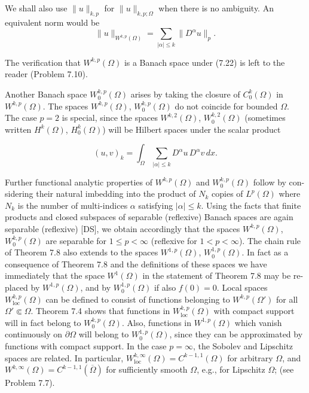 We shall also use $\|u\|_{k,p}$ for $\|u\|_{k,p;\Omega}$ when there is no ambiguity. An equivalent norm would be
\begin{equation}
\tag{7.23}
\|u\|_{W^{k,p}(\Omega)}=\sum_{|\alpha|\leq k} \|D^\alpha u\|_p.
\end{equation}

The verification that $W^{k,p}(\Omega)$ is a Banach space under (7.22) is left to the reader (Problem 7.10).


Another Banach space $W_{0}^{k,p}(\Omega)$ arises by taking the closure of $C_{0}^{k}(\Omega)$ in
$W^{k,p}(\Omega)$. The spaces $W^{k,p}(\Omega)$, $W_{0}^{k,p}(\Omega)$ do not coincide for bounded $\Omega$. The case
$p=2$ is special, since the spaces $W^{k,2}(\Omega)$, $W_{0}^{k,2}(\Omega)$ (sometimes written $H^{k}(\Omega)$,
$H_{0}^{k}(\Omega)$) will be Hilbert spaces under the scalar product

\begin{equation}
\tag{7.24}
(u,v)_{k}=\int_{\Omega}\sum_{|\alpha|\le k} D^{\alpha}u\,D^{\alpha}v\,dx.
\end{equation}

Further functional analytic properties of $W^{k,p}(\Omega)$ and $W_{0}^{k,p}(\Omega)$ follow by con-
sidering their natural imbedding into the product of $N_{k}$ copies of $L^{p}(\Omega)$ where
$N_{k}$ is the number of multi-indices $\alpha$ satisfying $|\alpha|\le k$. Using the facts that finite
products and closed subspaces of separable (reflexive) Banach spaces are again
separable (reflexive) [DS], we obtain accordingly that the spaces $W^{k,p}(\Omega)$, $W_{0}^{k,p}(\Omega)$
are separable for $1\le p<\infty$ (reflexive for $1<p<\infty$).
The chain rule of Theorem 7.8 also extends to the spaces $W^{1,p}(\Omega)$, $W_{0}^{1,p}(\Omega)$.
In fact as a consequence of Theorem 7.8 and the definitions of these spaces we have
immediately that the space $W^{1}(\Omega)$ in the statement of Theorem 7.8 may be re-
placed by $W^{1,p}(\Omega)$, and by $W_{0}^{1,p}(\Omega)$ if also $f(0)=0$.
Local spaces $W^{k,p}_{\mathrm{loc}}(\Omega)$ can be defined to consist of functions belonging to
$W^{k,p}(\Omega')$ for all $\Omega'\Subset \Omega$. Theorem 7.4 shows that functions in $W^{k,p}_{\mathrm{loc}}(\Omega)$ with
compact support will in fact belong to $W_{0}^{k,p}(\Omega)$. Also, functions in $W^{1,p}(\Omega)$ which
vanish continuously on $\partial\Omega$ will belong to $W_{0}^{1,p}(\Omega)$, since they can be approximated
by functions with compact support.
In the case $p=\infty$, the Sobolev and Lipschitz spaces are related. In particular,
$W^{k,\infty}_{\mathrm{loc}}(\Omega)=C^{k-1,1}(\Omega)$ for arbitrary $\Omega$, and $W^{k,\infty}(\Omega)=C^{k-1,1}(\overline{\Omega})$ for sufficiently
smooth $\Omega$, e.g., for Lipschitz $\Omega$; (see Problem 7.7).

